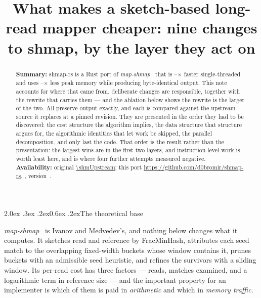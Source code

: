 \documentclass[10pt,a4paper,twocolumn]{article}
\title{\vspace{-1.0cm}\textbf{What makes a sketch-based long-read mapper
       cheaper: nine changes to shmap, by the layer they act on}}
\author{\shmAuthors}
\date{}
\makeatletter
\renewcommand\section{\@startsection{section}{1}{0pt}%
  {2.0ex \@plus .3ex \@minus .2ex}{0.6ex \@plus.2ex}{\normalsize\bfseries}}
\makeatother
\begin{document}
\maketitle
\vspace{-0.7cm}

\begin{abstract}
\noindent
\textbf{Summary:} shmap-rs is a Rust port of \emph{map-shmap}~\cite{shmap}
that is \shmSpeedupXMin--\shmSpeedupXMax$\times$ faster single-threaded and
uses \shmRssRatioMin--\shmRssRatioMax$\times$ less peak memory while producing
byte-identical output. This note accounts for where that came from.
\shmNumOptimizations{} deliberate changes are responsible, together with the
rewrite that carries them --- and the ablation below shows the rewrite is the
larger of the two. All \shmNumExactOptimizations{} preserve output exactly, and
each is compared against the upstream source it replaces at a pinned revision.
They are
presented in the order they had to be discovered: the cost structure the
algorithm implies, the data structure that structure argues for, the
algorithmic identities that let work be skipped, the parallel decomposition,
and only last the code. That order is the result rather than the presentation:
the largest wins are in the first two layers, and instruction-level work is
worth least here, and is where four further attempts measured
negative.\\[0.2em]
\textbf{Availability:} original \url{\shmUpstream}; this port
\url{https://github.com/d0bromir/shmap-rs}, \shmLicense, version~\shmVersion.
\end{abstract}



\section{The theoretical base}

\emph{map-shmap}~\cite{shmap} is Ivanov and Medvedev's, and nothing below
changes what it computes. It sketches read and reference by FracMinHash,
attributes each seed match to the overlapping fixed-width buckets whose window
contains it, prunes buckets with an admissible seed heuristic, and refines the
survivors with a sliding window. Its per-read cost has three factors --- reads,
matches examined, and a logarithmic term in reference size --- and the
important property for an implementer is which of them is paid in
\emph{arithmetic} and which in \emph{memory traffic}.
\end{document}
